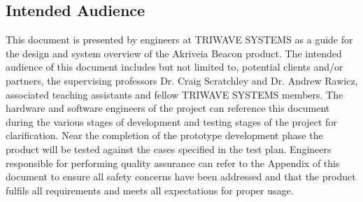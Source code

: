 \subsection{Intended Audience}

\medskip
This document is presented by engineers at TRIWAVE SYSTEMS as a guide for the design and system overview of the Akriveia Beacon product. The intended audience of this document includes but not limited to, potential clients and/or partners, the supervising professors Dr. Craig Scratchley and Dr. Andrew Rawicz, associated teaching assistants and fellow TRIWAVE SYSTEMS members. The hardware and software engineers of the project can reference this document during the various stages of development and testing stages of the project for clarification. Near the completion of the prototype development phase the product will be tested against the cases specified in the test plan. Engineers responsible for performing quality assurance can refer to the Appendix of this document to ensure all safety concerns have been addressed and that the product fulfils all requirements and meets all expectations for proper usage. 













